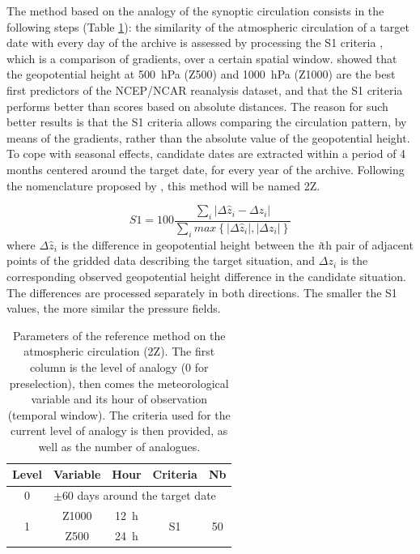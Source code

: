 \documentclass[5p]{elsarticle}
\begin{document}
The method based on the analogy of the synoptic circulation consists in the following steps (Table \ref{table:params_R1}): the similarity of the atmospheric circulation of a target date with every day of the archive is assessed by processing the S1 criteria \citep[Eq.\ \ref{eq:S1}, ][]{Teweles1954, Drosdowsky2003}, which is a comparison of gradients, over a certain spatial window. \citet{Bontron2005} showed that the geopotential height at 500~hPa (Z500) and 1000~hPa (Z1000) are the best first predictors of the NCEP/NCAR reanalysis dataset, and that the S1 criteria performs better than scores based on absolute distances. The reason for such better results is that the S1 criteria allows comparing the circulation pattern, by means of the gradients, rather than the absolute value of the geopotential height. To cope with seasonal effects, candidate dates are extracted within a period of 4 months centered around the target date, for every year of the archive. Following the nomenclature proposed by \citet{Horton2016}, this method will be named 2Z.

\begin{equation}
\label{eq:S1}
S1=100 \frac {\displaystyle \sum_{i} \vert \Delta\hat{z}_{i} - \Delta z_{i} \vert}
{\displaystyle \sum_{i} max\left\lbrace \vert \Delta\hat{z}_{i} \vert , \vert \Delta z_{i} \vert \right\rbrace }
\end{equation}
where $\Delta \hat{z}_{i}$ is the difference in geopotential height between the \textit{i}th pair of adjacent points of the gridded data describing the target situation, and $\Delta z_{i}$ is the corresponding observed geopotential height difference in the candidate situation. The differences are processed separately in both directions. The smaller the S1 values, the more similar the pressure fields.

\begin{table}[htb]
	\caption{Parameters of the reference method on the atmospheric circulation (2Z). The first column is the level of analogy (0 for preselection), then comes the meteorological variable and its hour of observation (temporal window). The criteria used for the current level of analogy is then provided, as well as the number of analogues.}
	\footnotesize
	\begin{center}
		\begin{tabular}{ccccc}
			\hline
			Level & Variable & Hour & Criteria & Nb \\ 
			\hline 
			0 & \multicolumn{4}{l}{$\pm 60$ days around the target date} \\
			\hline 
			\multirow{2}{*}{1} & Z1000 & 12~h & \multirow{2}{*}{S1} & \multirow{2}{*}{50} \\
			& Z500 & 24~h & & \\ 
			\hline 
		\end{tabular} 
	\end{center}
	\label{table:params_R1}
\end{table}
\end{document}
